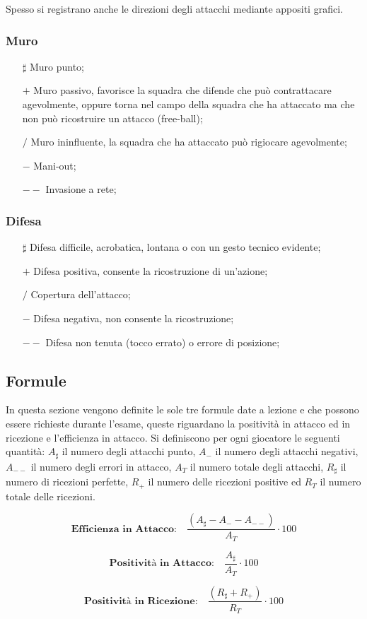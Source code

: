 Spesso si registrano anche le direzioni degli attacchi mediante appositi grafici.

\subsubsection{Muro}
\begin{enumerate}
\item[$\sharp$] Muro punto;
\item[$+$] Muro passivo, favorisce la squadra che difende che può contrattacare agevolmente, oppure torna nel campo della squadra che ha attaccato ma che non può ricostruire un attacco (free-ball);
\item[$/$] Muro ininfluente, la squadra che ha attaccato può rigiocare agevolmente;
\item[$-$] Mani-out;
\item[$--$] Invasione a rete;
\end{enumerate}

\subsubsection{Difesa}
\begin{enumerate}
\item[$\sharp$] Difesa difficile, acrobatica, lontana o con un gesto tecnico evidente;
\item[$+$] Difesa positiva, consente la ricostruzione di un'azione;
\item[$/$] Copertura dell'attacco;
\item[$-$] Difesa negativa, non consente la ricostruzione;
\item[$--$] Difesa non tenuta (tocco errato) o errore di posizione;
\end{enumerate}


\subsection{Formule}
In questa sezione vengono definite le sole tre formule date a lezione e che possono essere richieste durante l'esame, queste riguardano la positività in attacco ed in ricezione e l'efficienza in attacco. Si definiscono per ogni giocatore le seguenti quantità: $A_{\sharp}$ il numero degli attacchi punto, $A_{-}$ il numero degli attacchi negativi, $A_{--}$ il numero degli errori in attacco, $A_{T}$ il numero totale degli attacchi, $R_{\sharp}$ il numero di ricezioni perfette, $R_{+}$ il numero delle ricezioni positive ed $R_{T}$ il numero totale delle ricezioni.

\begin{flushleft}
 \[
\textbf{Efficienza in Attacco:} \quad
 \frac{(A_{\sharp} - A_{-} - A_{--})}{A_{T}} \cdot 100
 \]
\end{flushleft}
 
\begin{flushleft}
\[
\textbf{Positività in Attacco:} \quad
 \frac{A_{\sharp}}{A_{T}} \cdot 100
\]
\end{flushleft}

\begin{center}
\[
\textbf{Positività in Ricezione:} \quad
 \frac{(R_{\sharp} + R_{+})}{R_{T}} \cdot 100
\]
\end{center}
